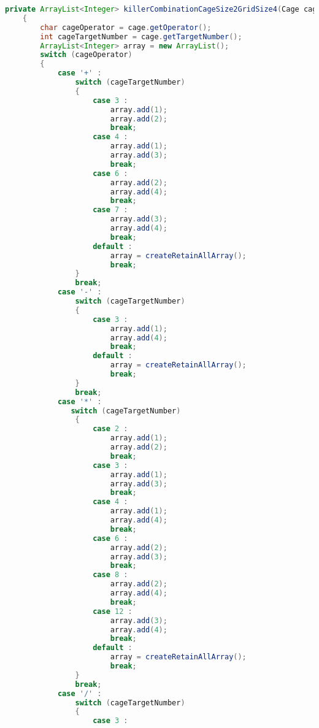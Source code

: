 \begin{lstlisting}[language=Java,basicstyle=\tiny,caption=SolverRuleBased.java]
    private ArrayList<Integer> killerCombinationCageSize2GridSize4(Cage cage)
    {
        char cageOperator = cage.getOperator();
        int cageTargetNumber = cage.getTargetNumber();
        ArrayList<Integer> array = new ArrayList();
        switch (cageOperator)
        {
            case '+' :
                switch (cageTargetNumber)
                {
                    case 3 :
                        array.add(1);
                        array.add(2);
                        break;
                    case 4 :  
                        array.add(1);
                        array.add(3);
                        break;
                    case 6 :
                        array.add(2);
                        array.add(4);
                        break;
                    case 7 :
                        array.add(3);
                        array.add(4);
                        break;
                    default :
                        array = createRetainAllArray();
                        break;
                }
                break;
            case '-' :
                switch (cageTargetNumber)
                {
                    case 3 :
                        array.add(1);
                        array.add(4);
                        break;
                    default :
                        array = createRetainAllArray();
                        break;
                }
                break;
            case '*' :
               switch (cageTargetNumber)
                {
                    case 2 :
                        array.add(1);
                        array.add(2);
                        break;
                    case 3 :
                        array.add(1);
                        array.add(3);
                        break;
                    case 4 :
                        array.add(1);
                        array.add(4);
                        break;
                    case 6 :
                        array.add(2);
                        array.add(3);
                        break;
                    case 8 :
                        array.add(2);
                        array.add(4);
                        break;
                    case 12 :
                        array.add(3);
                        array.add(4);
                        break;
                    default :
                        array = createRetainAllArray();
                        break;
                }
                break;
            case '/' :
                switch (cageTargetNumber)
                {
                    case 3 :

\end{lstlisting}
